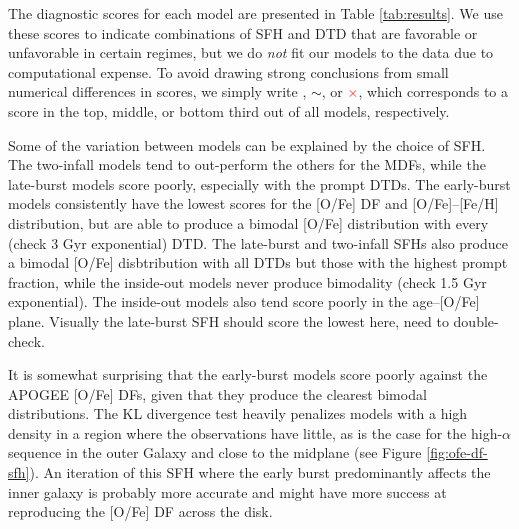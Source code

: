 \documentclass[twocolumn,twocolappendix,linenumbers]{aastex631}
\newcommand{\yes}{\textcolor{green}{\checkmark}\xspace}
\newcommand{\meh}{\textcolor{black}{$\sim$}\xspace}
\newcommand{\no}{\textcolor{red}{$\times$}\xspace}
\newcommand{\todo}[1]{{\color{red}#1}}
\begin{document}
The diagnostic scores for each model are presented in Table \ref{tab:results}. We use these scores to indicate combinations of SFH and DTD that are favorable or unfavorable in certain regimes, but we do {\it not} fit our models to the data due to computational expense.
To avoid drawing strong conclusions from small numerical differences in scores, 
we simply write \yes, \meh, or \no, which corresponds to a score in the top, middle, or bottom third out of all models, respectively.

Some of the variation between models can be explained by the choice of SFH. The two-infall models tend to out-perform the others for the MDFs, while the late-burst models score poorly, especially with the prompt DTDs. The early-burst models consistently have the lowest scores for the [O/Fe] DF and [O/Fe]--[Fe/H] distribution, but are able to produce a bimodal [O/Fe] distribution with every \todo{(check 3 Gyr exponential)} DTD. The late-burst and two-infall SFHs also produce a bimodal [O/Fe] disbtribution with all DTDs but those with the highest prompt fraction, while the inside-out models never produce bimodality \todo{(check 1.5 Gyr exponential)}. The inside-out models also tend score poorly in the age--[O/Fe] plane. \todo{Visually the late-burst SFH should score the lowest here, need to double-check.} 

It is somewhat surprising that the early-burst models score poorly against the APOGEE [O/Fe] DFs, given that they produce the clearest bimodal distributions. The KL divergence test heavily penalizes models with a high density in a region where the observations have little, as is the case for the high-$\alpha$ sequence in the outer Galaxy and close to the midplane (see Figure \ref{fig:ofe-df-sfh}). An iteration of this SFH where the early burst predominantly affects the inner galaxy is probably more accurate and might have more success at reproducing the [O/Fe] DF across the disk. 
\end{document}
